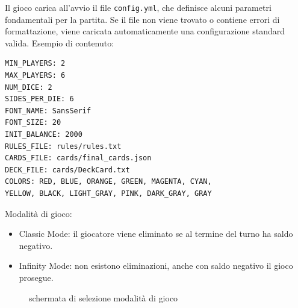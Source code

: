 Il gioco carica all’avvio il file \texttt{config.yml}, che definisce alcuni parametri fondamentali per la partita. Se il file non viene trovato o contiene errori di formattazione, viene caricata automaticamente una configurazione standard valida.\newline
Esempio di contenuto:\newline
\begin{verbatim}
MIN_PLAYERS: 2
MAX_PLAYERS: 6
NUM_DICE: 2
SIDES_PER_DIE: 6
FONT_NAME: SansSerif
FONT_SIZE: 20
INIT_BALANCE: 2000
RULES_FILE: rules/rules.txt
CARDS_FILE: cards/final_cards.json
DECK_FILE: cards/DeckCard.txt
COLORS: RED, BLUE, ORANGE, GREEN, MAGENTA, CYAN, 
YELLOW, BLACK, LIGHT_GRAY, PINK, DARK_GRAY, GRAY
\end{verbatim}
Modalità di gioco:\newline
\begin{itemize}
    \item Classic Mode: il giocatore viene eliminato se al termine del turno ha saldo negativo.
    \item Infinity Mode: non esistono eliminazioni, anche con saldo negativo il gioco prosegue.
\end{itemize}
\begin{figure}[H]
    \centering
    \caption{schermata di selezione modalità di gioco}
	\label{img:gamescreen3}
\end{figure}
